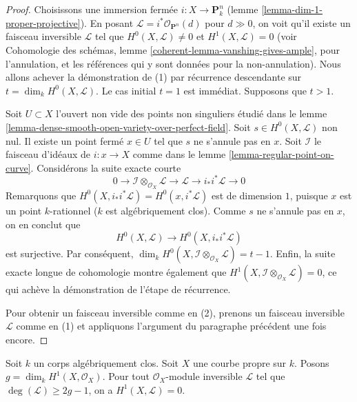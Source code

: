 \begin{proof}
Choisissons une immersion fermée $i : X \to \mathbf{P}^n_k$
(lemme \ref{lemma-dim-1-proper-projective}).
En posant $\mathcal{L} = i^*\mathcal{O}_{\mathbf{P}^n}(d)$
pour $d \gg 0$, on voit qu'il existe un faisceau inversible
$\mathcal{L}$ tel que $H^0(X, \mathcal{L}) \not = 0$ et
$H^1(X, \mathcal{L}) = 0$ (voir
Cohomologie des schémas, lemme \ref{coherent-lemma-vanshing-gives-ample},
pour l'annulation, et les références qui y sont données pour la non-annulation).
Nous allons achever la démonstration de (1) par récurrence descendante sur
$t = \dim_k H^0(X, \mathcal{L})$. Le cas initial $t = 1$ est immédiat.
Supposons que $t > 1$.

\medskip\noindent
Soit $U \subset X$ l'ouvert non vide des points non singuliers
étudié dans le lemme \ref{lemma-dense-smooth-open-variety-over-perfect-field}.
Soit $s \in H^0(X, \mathcal{L})$ non nul. Il existe un point
fermé $x \in U$ tel que $s$ ne s'annule pas en $x$. Soit $\mathcal{I}$
le faisceau d'idéaux de $i : x \to X$ comme dans le
lemme \ref{lemma-regular-point-on-curve}. Considérons la
suite exacte courte
$$
0 \to \mathcal{I} \otimes_{\mathcal{O}_X} \mathcal{L} \to
\mathcal{L} \to i_*i^*\mathcal{L} \to 0
$$
Remarquons que $H^0(X, i_*i^*\mathcal{L}) = H^0(x, i^*\mathcal{L})$
est de dimension $1$, puisque $x$ est un point $k$-rationnel ($k$ est
algébriquement clos). Comme $s$ ne s'annule pas en $x$, on en conclut que
$$
H^0(X, \mathcal{L}) \longrightarrow H^0(X, i_*i^*\mathcal{L})
$$
est surjective. Par conséquent,
$\dim_k H^0(X, \mathcal{I} \otimes_{\mathcal{O}_X} \mathcal{L}) = t - 1$.
Enfin, la suite exacte longue de cohomologie montre également que
$H^1(X, \mathcal{I} \otimes_{\mathcal{O}_X} \mathcal{L}) = 0$,
ce qui achève la démonstration de l'étape de récurrence.

\medskip\noindent
Pour obtenir un faisceau inversible comme en (2), prenons un faisceau inversible
$\mathcal{L}$ comme en (1) et appliquons l'argument du paragraphe précédent
une fois encore.
\end{proof}

\begin{lemma}
\label{lemma-vanishing-degree-2g-and-1-line-bundle}
Soit $k$ un corps algébriquement clos. Soit $X$ une courbe propre sur $k$.
Posons $g = \dim_k H^1(X, \mathcal{O}_X)$. Pour tout
$\mathcal{O}_X$-module inversible $\mathcal{L}$ tel que $\deg(\mathcal{L}) \geq 2g - 1$,
on a $H^1(X, \mathcal{L}) = 0$.
\end{lemma}

